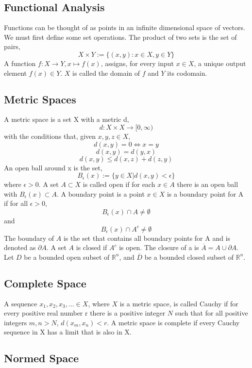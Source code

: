 \documentclass[12pt]{article}
\begin{document}
\begin{flushleft}
\section{Functional Analysis}

\qquad Functions can be thought of as points in an infinite dimensional space of vectors. We must first define some set operations.
The product of two sets is the set of pairs,
$$X \times Y := \{(x,y):x\in X, y\in Y\}$$
A function $f:X\rightarrow Y, x\mapsto f(x)$, assigns, for every input $x\in X$, a unique output element $f(x)\in Y$. $X$ is called the domain of $f$ and $Y$ its codomain. 

\subsection{Metric Spaces}

A metric space is a set X with a metric d,
$$d:X\times X \rightarrow [0,\infty)$$
with the conditions that, given $x,y,z\in X$,
$$d(x,y)=0 \Leftrightarrow x=y$$
$$d(x,y) = d(y,x)$$
$$d(x,y) \leq d(x,z)+d(z,y)$$
An open ball around x is the set,
$$B_\epsilon(x) := \{y\in X |  d(x,y)<\epsilon\}$$
where $\epsilon > 0$. A set $A\subset X$ is called open if for each $x\in A$ there is an open ball with $B_\epsilon(x)\subset A$. A boundary point is a point $x\in X$ is a boundary point for A if for all $\epsilon>0$, $$B_\epsilon(x)\cap A \neq \emptyset$$ 
and 
$$B_\epsilon(x)\cap A^c \neq \emptyset$$
The boundary of $A$ is the set that contains all boundary points for A and is denoted as $\partial A$. A set $A$ is closed if $A^c$ is open. The closure of a is $\overline{A} = A \cup \partial A$. Let $D$ be a bounded open subset of $\mathbb{R}^n$, and $\overline{D}$ be a bounded closed subset of $\mathbb{R}^n$. 

\subsection{Complete Space}

\qquad A sequence $x_1,x_2,x_3,...\in X$, where $X$ is a metric space, is called Cauchy if for every positive real number r there is a positive integer $N$ such that for all positive integers $m,n>N$, $d(x_m,x_n)<r$. A metric space is complete if every Cauchy sequence in X has a limit that is also in X.

\subsection{Normed Space}


\end{flushleft}
\end{document}
